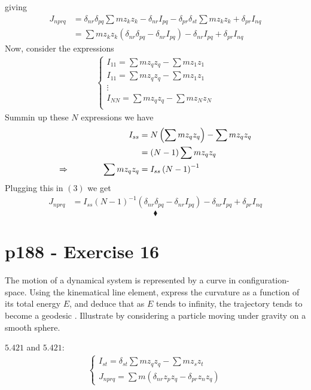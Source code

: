 giving 
\begin{align}
J_{nprq}& =  \delta_{nr} \delta_{pq}\sum m z_k z_k-\delta_{nr}I_{pq} - \delta_{pr} \delta_{st}\sum m z_k z_k+\delta_{pr}I_{nq} \\
&= \sum m z_k z_k\left( \delta_{nr} \delta_{pq}- \delta_{nr}I_{pq}\right)-\delta_{nr}I_{pq} +\delta_{pr}I_{nq}
\end{align}
Now, consider the expressions 
\begin{align}
\left\{\begin{array}{l}
I_{11}= \sum m z_q z_q - \sum m z_1 z_1\\
I_{11}= \sum m z_q z_q - \sum m z_1 z_1\\
\vdots\\
I_{NN} = \sum m z_q z_q - \sum m z_N z_N\\
\end{array}\right.
\end{align}
Summin up these $N$ expressions we have
\begin{align}
I_{ss} &= N\left( \sum m z_q z_q \right) - \sum m z_q z_q\\
&= \left( N-1  \right)\sum m z_q z_q \\
\Rightarrow\quad\quad\quad\quad \sum m z_q z_q &= I_{ss} \left( N-1  \right)^{-1}
\end{align}
Plugging this in $(3)$ we get
\begin{align}
J_{nprq}
&= I_{ss} \left( N-1  \right)^{-1}\left( \delta_{nr} \delta_{pq}- \delta_{nr}I_{pq}\right)-\delta_{nr}I_{pq} +\delta_{pr}I_{nq}
\end{align}
$$\blacklozenge$$
\newpage


\section{p188 - Exercise 16}
\begin{tcolorbox}
The motion of a dynamical system is represented by a curve in configuration-space. Using the kinematical line element, express the curvature as a function of its total energy $E$, and deduce that as $E$ tends to infinity, the trajectory tends to become a geodesic . Illustrate by considering a particle moving under gravity on a smooth sphere.
\end{tcolorbox} 
$\mathbf{5.421}$ and $\mathbf{5.421}$:
\begin{align}
\left\{\begin{array}{l}
I_{st}= \delta_{st}\sum m z_q z_q - \sum m z_s z_t\\
J_{nprq} = \sum m \left( \delta_{nr} z_p z_q - \delta_{pr} z_n z_q \right)
\end{array}\right.
\end{align}

